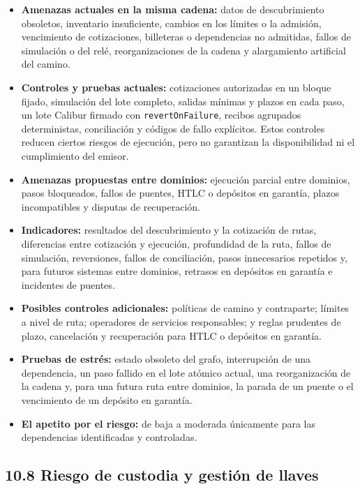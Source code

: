 \documentclass[11pt]{article}
\begin{document}
\begin{itemize}[leftmargin=*]
\item \textbf{Amenazas actuales en la misma cadena:} datos de descubrimiento obsoletos, inventario insuficiente, cambios en los límites o la admisión, vencimiento de cotizaciones, billeteras o dependencias no admitidas, fallos de simulación o del relé, reorganizaciones de la cadena y alargamiento artificial del camino.
\item \textbf{Controles y pruebas actuales:} cotizaciones autorizadas en un bloque fijado, simulación del lote completo, salidas mínimas y plazos en cada paso, un lote Calibur firmado con \texttt{revertOnFailure}, recibos agrupados deterministas, conciliación y códigos de fallo explícitos. Estos controles reducen ciertos riesgos de ejecución, pero no garantizan la disponibilidad ni el cumplimiento del emisor.
\item \textbf{Amenazas propuestas entre dominios:} ejecución parcial entre dominios, pasos bloqueados, fallos de puentes, HTLC o depósitos en garantía, plazos incompatibles y disputas de recuperación.
\item \textbf{Indicadores:} resultados del descubrimiento y la cotización de rutas, diferencias entre cotización y ejecución, profundidad de la ruta, fallos de simulación, reversiones, fallos de conciliación, pasos innecesarios repetidos y, para futuros sistemas entre dominios, retrasos en depósitos en garantía e incidentes de puentes.
\item \textbf{Posibles controles adicionales:} políticas de camino y contraparte; límites a nivel de ruta; operadores de servicios responsables; y reglas prudentes de plazo, cancelación y recuperación para HTLC o depósitos en garantía.
\item \textbf{Pruebas de estrés:} estado obsoleto del grafo, interrupción de una dependencia, un paso fallido en el lote atómico actual, una reorganización de la cadena y, para una futura ruta entre dominios, la parada de un puente o el vencimiento de un depósito en garantía.
\item \textbf{El apetito por el riesgo:} de baja a moderada únicamente para las dependencias identificadas y controladas.
\end{itemize}
\subsection*{10.8 Riesgo de custodia y gestión de llaves}
\end{document}
